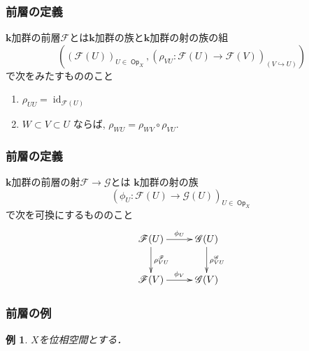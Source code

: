 \documentclass[dvipdfmx,12pt,aspectratio=169,leqno]{beamer}%
\newcommand{\kk}{\mathbf{k}}
\numberwithin{equation}{subsection}
\newcommand{\Op}{\mathop{\textsf{Op}}\nolimits}
\newcommand{\id}{\mathop{\mathrm{id}}\nolimits}
\theoremstyle{mystyle}
\newtheorem{EG}[AXM]{例}
\begin{document}
\begin{frame}
    \frametitle{前層の定義}

    \begin{definition}[前層]
        \(\kk\)加群の前層\(\mathscr{F}\)とは\(\kk\)加群の族と\(\kk\)加群の射の族の組\[\left(
        \left(\mathscr{F}(U)\right)_{U\in\Op_{X}},
        \left(\rho_{VU}\colon\mathscr{F}(U)\to\mathscr{F}(V)\right)_{(V\hookrightarrow U)}
    \right)\]で次をみたすもののこと
    \begin{enumerate}
        \item $\rho_{UU} = \id_{\mathscr{F}(U)}$ 
        \item $W \subset V \subset U$ ならば, 
        $\rho_{WU} = \rho_{WV} \circ \rho_{VU}$.\label{enum:res}
    \end{enumerate}
    \end{definition}
\end{frame}
\begin{frame}
    \frametitle{前層の定義}

    \begin{definition}[前層の射]
        \(\kk\)加群の前層の射\(\mathscr{F}\to\mathscr{G}\)とは
        \(\kk\)加群の射の族\[
            (\phi_{U}\colon \mathscr{F}(U)
            \to \mathscr{G}(U))_{U\in\Op_{X}}
        \]
        で次を可換にするもののこと
        \[\vcenter{\xymatrix@C=26pt@R=26pt{
            \mathscr{F}(U)
            \ar[r]^-{\phi_{U}}
            \ar[d]^-{\rho^{\mathscr{F}}_{VU}}
            &
            \mathscr{G}(U)
            \ar[d]^-{\rho^{\mathscr{G}}_{VU}} 
            \\
            \mathscr{F}(V)
            \ar[r]^-{\phi_{V}}
            &
            \mathscr{G}(V)
            }}
        \]
    \end{definition}
\end{frame}
\begin{frame}
    \frametitle{前層の例}
\begin{EG}
    \(X\)を位相空間とする．
\end{EG}
\end{frame}
\end{document}
